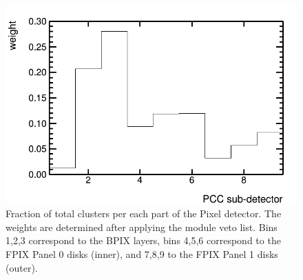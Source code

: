 \newpage
\begin{figure}[hc]
  \begin{center}
    \includegraphics[width=0.7\linewidth]{plots/PCCWeights.png}
    \caption{
      Fraction of total clusters per each part of the Pixel detector. The weights are determined after applying the module veto list.
      Bins 1,2,3 correspond to the BPIX layers, bins 4,5,6 correspond to the FPIX Panel 0 disks (inner), and 7,8,9 to the FPIX Panel 1 disks (outer).
      \label{fig:pixelweights}
    }
  \end{center}
\end{figure}
